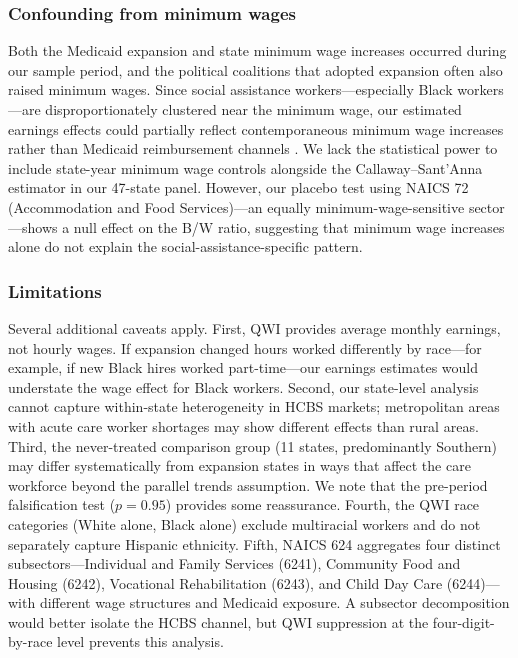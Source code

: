 \documentclass[12pt]{article}
\begin{document}
\subsubsection*{Confounding from minimum wages} Both the Medicaid expansion and state minimum wage increases occurred during our sample period, and the political coalitions that adopted expansion often also raised minimum wages. Since social assistance workers---especially Black workers---are disproportionately clustered near the minimum wage, our estimated earnings effects could partially reflect contemporaneous minimum wage increases rather than Medicaid reimbursement channels \citep{cengiz2019effect}. We lack the statistical power to include state-year minimum wage controls alongside the Callaway--Sant'Anna estimator in our 47-state panel. However, our placebo test using NAICS 72 (Accommodation and Food Services)---an equally minimum-wage-sensitive sector---shows a null effect on the B/W ratio, suggesting that minimum wage increases alone do not explain the social-assistance-specific pattern.

\subsubsection*{Limitations} Several additional caveats apply. First, QWI provides average monthly earnings, not hourly wages. If expansion changed hours worked differently by race---for example, if new Black hires worked part-time---our earnings estimates would understate the wage effect for Black workers. Second, our state-level analysis cannot capture within-state heterogeneity in HCBS markets; metropolitan areas with acute care worker shortages may show different effects than rural areas. Third, the never-treated comparison group (11 states, predominantly Southern) may differ systematically from expansion states in ways that affect the care workforce beyond the parallel trends assumption. We note that the pre-period falsification test ($p = 0.95$) provides some reassurance. Fourth, the QWI race categories (White alone, Black alone) exclude multiracial workers and do not separately capture Hispanic ethnicity. Fifth, NAICS 624 aggregates four distinct subsectors---Individual and Family Services (6241), Community Food and Housing (6242), Vocational Rehabilitation (6243), and Child Day Care (6244)---with different wage structures and Medicaid exposure. A subsector decomposition would better isolate the HCBS channel, but QWI suppression at the four-digit-by-race level prevents this analysis.
\end{document}

